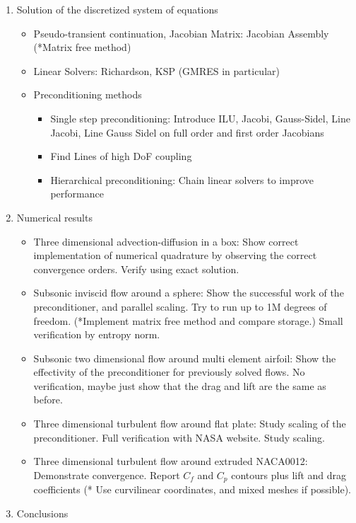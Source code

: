 \begin{enumerate}
\item Solution of the discretized system of equations
  \begin{itemize}
  \item Pseudo-transient continuation, Jacobian Matrix: Jacobian
    Assembly (*Matrix free method)
  \item Linear Solvers: Richardson, KSP (GMRES in particular)
  \item Preconditioning methods
    \begin{itemize}
    \item Single step preconditioning: Introduce ILU, Jacobi, Gauss-Sidel, Line
      Jacobi, Line Gauss Sidel on full order and first order Jacobians
    \item Find Lines of high DoF coupling  
    \item Hierarchical preconditioning: Chain linear solvers to
      improve performance
    \end{itemize}
  \end{itemize}
  
\item Numerical results
  \begin{itemize}
    \item Three dimensional advection-diffusion in a box: Show correct
      implementation of numerical quadrature by observing the correct
      convergence orders. Verify using exact solution.
    \item Subsonic inviscid flow around a sphere: Show the successful
      work of the preconditioner, and parallel scaling. Try to run up
      to 1M degrees of freedom. (*Implement matrix free method and
      compare storage.) Small verification by entropy norm.
    \item Subsonic two dimensional flow around multi element airfoil:
      Show the effectivity of the preconditioner for previously solved
      flows. No verification, maybe just show that the drag and lift
      are the same as before.
    \item Three dimensional turbulent flow around flat plate: Study
      scaling of the preconditioner. Full verification with NASA
      website. Study scaling.
      \item Three dimensional turbulent flow around extruded
        NACA0012: Demonstrate convergence. Report $C_f$ and $C_p$
        contours plus lift and drag coefficients (* Use curvilinear
        coordinates, and mixed meshes if possible).
  \end{itemize}
  
\item Conclusions

\end{enumerate}

\endinput
